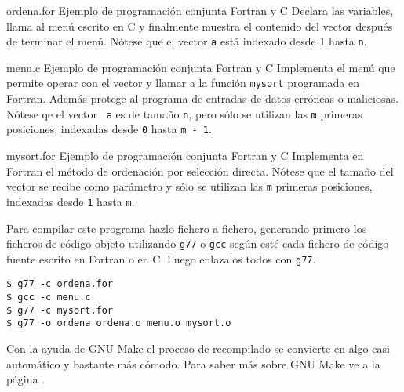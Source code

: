 \begin{ejemplo}%
{ordena.for}%
{Ejemplo de programación conjunta Fortran y C}
Declara las variables, llama al menú escrito en C y finalmente muestra
el contenido del vector después de terminar el menú. Nótese que el 
vector {\tt a} está indexado desde 1 hasta {\tt n}.
\end{ejemplo}

\begin{ejemplo}%
{menu.c}%
{Ejemplo de programación conjunta Fortran y C}
Implementa el  menú que  permite operar  con el vector  y llamar  a la
función {\tt mysort} programada en Fortran. Además protege al programa
de entradas de  datos erróneas o maliciosas. Nótese qe  el vector {\tt
a} es de tamaño  {\tt *n}, pero sólo se utilizan  las {\tt m} primeras
posiciones, indexadas desde {\tt 0} hasta {\tt m - 1}.
\end{ejemplo}

\begin{ejemplo}%
{mysort.for}%
{Ejemplo de programación conjunta Fortran y C}
Implementa en Fortran  el método de ordenación  por selección directa.
Nótese que  el tamaño del  vector se recibe  como parámetro y  sólo se
utilizan  las {\tt  m} primeras  posiciones, indexadas  desde {\tt  1}
hasta {\tt m}.
\end{ejemplo}

Para compilar este programa hazlo fichero a fichero, generando primero
los ficheros de  código objeto utilizando {\tt g77} o  {\tt gcc} según
esté cada  fichero de código fuente  escrito en Fortran o  en C. Luego
enlazalos todos con {\tt g77}.

\begin{verbatim}
$ g77 -c ordena.for 
$ gcc -c menu.c 
$ g77 -c mysort.for 
$ g77 -o ordena ordena.o menu.o mysort.o
\end{verbatim}

Con la  ayuda de GNU  Make el proceso  de recompilado se  convierte en
algo casi automático  y bastante más cómodo. Para saber  más sobre GNU
Make ve a la página \pageref{make}.

